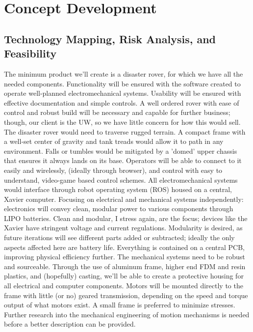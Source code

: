 \documentclass[a4paper, 10pt]{article}
\begin{document}
\pagebreak	

\section{Concept Development}

	\subsection{Technology Mapping, Risk Analysis, and Feasibility}
	The minimum product we'll create is a disaster rover, for which we have all the needed components. Functionality will be ensured with the software created to operate well-planned electromechanical systems. Usability will be ensured with effective documentation and simple controls. A well ordered rover with ease of control and robust build will be necessary and capable for further business; though, our client is the UW, so we have little concern for how this would  sell.
	The disaster rover would need to traverse rugged terrain. A compact frame with a well-set center of gravity and tank treads would allow it to path in any environment. Falls or tumbles would be mitigated by a 'domed' upper chassis that ensures it always lands on its base. Operators will be able to connect to it easily and wirelessly, (ideally through browser), and control with easy to understand, video-game based control schemes. All electromechanical systems would interface through robot operating system (ROS) housed on a central, Xavier computer. Focusing on electrical and mechanical systems independently: electronics will convey clean, modular power to various components through LIPO batteries. Clean and modular, I stress again, are the focus; devices like the Xavier have stringent voltage and current regulations. Modularity is desired, as future iterations will see different parts added or subtracted; ideally the only aspects affected here are battery life. Everything is contained on a central PCB, improving physical efficiency further. The mechanical systems need to be robust and sourceable. Through the use of aluminum frame, higher end FDM and resin plastics, and (hopefully) casting, we'll be able to create a protective housing for all electrical and computer components. Motors will be mounted directly to the frame with little (or no) geared transmission, depending on the speed and torque output of what motors exist. A small frame is preferred to minimize stresses. Further research into the mechanical engineering of motion mechanisms is needed before a better description can be provided. 
\end{document}
